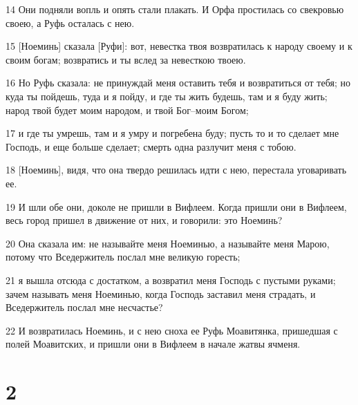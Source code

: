 \par 14 Они подняли вопль и опять стали плакать. И Орфа простилась со свекровью своею, а Руфь осталась с нею.
\par 15 [Ноеминь] сказала [Руфи]: вот, невестка твоя возвратилась к народу своему и к своим богам; возвратись и ты вслед за невесткою твоею.
\par 16 Но Руфь сказала: не принуждай меня оставить тебя и возвратиться от тебя; но куда ты пойдешь, туда и я пойду, и где ты жить будешь, там и я буду жить; народ твой будет моим народом, и твой Бог--моим Богом;
\par 17 и где ты умрешь, там и я умру и погребена буду; пусть то и то сделает мне Господь, и еще больше сделает; смерть одна разлучит меня с тобою.
\par 18 [Ноеминь], видя, что она твердо решилась идти с нею, перестала уговаривать ее.
\par 19 И шли обе они, доколе не пришли в Вифлеем. Когда пришли они в Вифлеем, весь город пришел в движение от них, и говорили: это Ноеминь?
\par 20 Она сказала им: не называйте меня Ноеминью, а называйте меня Марою, потому что Вседержитель послал мне великую горесть;
\par 21 я вышла отсюда с достатком, а возвратил меня Господь с пустыми руками; зачем называть меня Ноеминью, когда Господь заставил меня страдать, и Вседержитель послал мне несчастье?
\par 22 И возвратилась Ноеминь, и с нею сноха ее Руфь Моавитянка, пришедшая с полей Моавитских, и пришли они в Вифлеем в начале жатвы ячменя.

\chapter{2}

